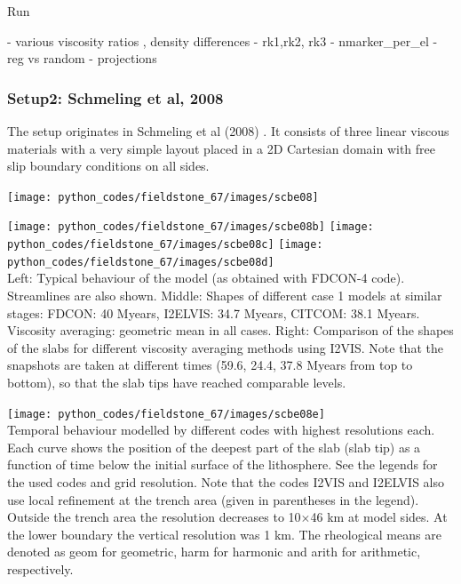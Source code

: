 Run 

- various viscosity ratios , density differences
- rk1,rk2, rk3
- nmarker\_per\_el
- reg vs random
- projections




\subsubsection*{Setup2: Schmeling et al, 2008}

The setup originates in Schmeling et al (2008) \cite{scbe08}. It consists of three linear viscous
materials with a very simple layout placed in a 2D Cartesian domain with free slip boundary conditions 
on all sides. 

\begin{center}
\texttt{[image: python\_codes/fieldstone\_67/images/scbe08]}
\end{center}

\begin{center}
\texttt{[image: python\_codes/fieldstone\_67/images/scbe08b]}
\texttt{[image: python\_codes/fieldstone\_67/images/scbe08c]}
\texttt{[image: python\_codes/fieldstone\_67/images/scbe08d]}\\
{\captionfont Left: Typical behaviour of the model (as obtained with FDCON-4 code). 
Streamlines are also shown.
Middle: Shapes of different case 1 models at similar stages: FDCON: 40 Myears,
I2ELVIS: 34.7 Myears, CITCOM: 38.1 Myears. Viscosity averaging: geometric mean
in all cases.
Right: Comparison of the shapes of the slabs for different viscosity averaging methods 
using I2VIS. Note that the snapshots are taken at different times (59.6, 24.4,
37.8 Myears from top to bottom), so that the slab tips have reached comparable
levels.}
\end{center}

\begin{center}
\texttt{[image: python\_codes/fieldstone\_67/images/scbe08e]}\\
{\captionfont 
Temporal behaviour modelled by different codes with highest resolutions each. 
Each curve shows the position of the deepest part of the slab (slab tip) as
a function of time below the initial surface of the lithosphere. 
See the legends for the used codes and grid resolution. 
Note that the codes I2VIS and I2ELVIS also use local
refinement at the trench area (given in parentheses in the legend). 
Outside the trench area the resolution decreases to 10$\times$46 km at model sides. 
At the lower boundary the vertical resolution was 1 km. 
The rheological means are denoted as geom for geometric, harm for harmonic 
and arith for arithmetic, respectively. }
\end{center}


